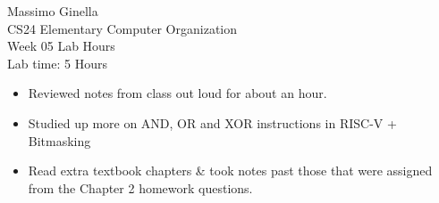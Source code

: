 \documentclass[12pt]{article}
\begin{document}
	\begin{center}
		Massimo Ginella \\
		CS24 Elementary Computer Organization \\
		Week 05 Lab Hours \\
		Lab time: 5 Hours \vspace{0.5cm} \\
	\end{center}
	
	\begin{itemize}
		\item Reviewed notes from class out loud for about an hour.
		\item Studied up more on AND, OR and XOR instructions in RISC-V + Bitmasking
		\item Read extra textbook chapters \& took notes past those that were assigned from the Chapter 2 homework questions.
	\end{itemize}
	
	
	
\end{document}

